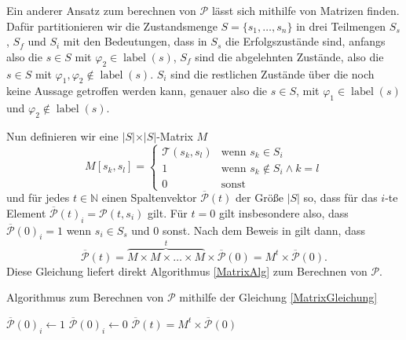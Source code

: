 Ein anderer Ansatz zum berechnen von $\mathcal{P}$ lässt sich mithilfe von Matrizen finden. 
Dafür partitionieren wir die Zustandsmenge $S=\{s_1,\dots,s_n\}$ in drei Teilmengen $S_s$, $S_f$ und $S_i$ mit den Bedeutungen, dass in $S_s$ die Erfolgszustände sind, anfangs also die $s\in S$ mit $\varphi_2\in \operatorname{label}(s)$, $S_f$ sind die abgelehnten Zustände, also die $s\in S$ mit $\varphi_1,\varphi_2 \notin \operatorname{label}(s)$. 
$S_i$ sind die restlichen Zustände über die noch keine Aussage getroffen werden kann, genauer also die $s\in S$, mit $\varphi_1\in \operatorname{label}(s)$ und $\varphi_2\notin \operatorname{label}(s)$. \cite{hansson1994logic}

Nun definieren wir eine $\vert S \vert \times \vert S \vert$-Matrix $M$
$$M[s_k,s_l] = \begin{cases}
	\mathcal{T}(s_k,s_l) & \text{wenn } s_k\in S_i \\
	1 & \text{wenn } s_k\notin S_i \land k=l \\
	0 & \text{sonst}
\end{cases}$$
und für jedes $t\in \mathbb{N}$ einen Spaltenvektor $\overline{\mathcal{P}}(t)$ der Größe $\vert S \vert$ so, dass für das $i$-te Element $\overline{\mathcal{P}}(t)_i=\mathcal{P}(t,s_i)$ gilt. 
Für $t=0$ gilt insbesondere also, dass $\overline{\mathcal{P}}(0)_i=1$ wenn $s_i\in S_s$ und $0$ sonst.
Nach dem Beweis in \cite{hansson1994logic} gilt dann, dass 
\begin{equation}
	\overline{\mathcal{P}}(t)=\overbrace{M \times M \times \dots \times M}^t \times \overline{\mathcal{P}}(0) = M^t\times \overline{\mathcal{P}}(0).
	\label{MatrixGleichung}
\end{equation}
Diese Gleichung liefert direkt Algorithmus \ref{MatrixAlg} zum Berechnen von $\mathcal{P}$. \cite{hansson1994logic}

\begin{algorithm}[h]
	\caption{Algorithmus zum Berechnen von $\mathcal{P}$ mithilfe der Gleichung \ref{MatrixGleichung} \cite{hansson1994logic}}
	\label{MatrixAlg}
	
	\begin{algorithmic}
		\State $\overline{\mathcal{P}}(0)_i \gets 1$
		\Else
		\State $\overline{\mathcal{P}}(0)_i \gets 0$
		\EndIf
		\EndFor
		\State $\overline{\mathcal{P}}(t)=M^t\times \overline{\mathcal{P}}(0)$
	\end{algorithmic}
\end{algorithm}

